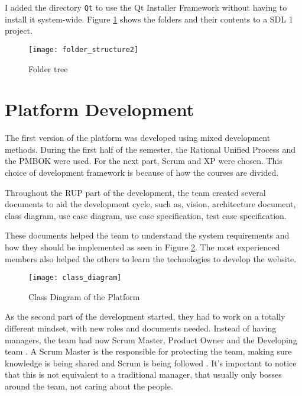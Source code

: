 I added the directory \texttt{Qt} to use the Qt Installer Framework without having to install it system-wide. Figure \ref{fig:folder_structure} shows the folders and their contents to a SDL 1 project.

\begin{figure}[h!]
\centering
\texttt{[image: folder\_structure2]}
\caption{Folder tree}
\label{fig:folder_structure}
\end{figure}

\section{Platform Development}
\label{sec:platform_development}

The first version of the platform was developed using mixed development methods. During the first half of the semester, the Rational Unified Process  and the PMBOK were used. For the next part, Scrum and XP were chosen. This choice of development framework is because of how the courses are divided.

Throughout the RUP part of the development, the team created several documents to aid the development cycle, such as, vision, architecture document, class diagram, use case diagram, use case specification, test case specification.

These documents helped the team to understand the system requirements and how they should be implemented as seen in Figure \ref{fig:class_diagram}. The most experienced members also helped the others to learn the technologies to develop the website.


\begin{figure}[h!]
\centering
\texttt{[image: class\_diagram]}
\caption{Class Diagram of the Platform \cite{plataforma2017arquitetura}}
\label{fig:class_diagram}
\end{figure}

As the second part of the development started, they had to work on a totally different mindset, with new roles and documents needed. Instead of having managers, the team had now Scrum Master, Product Owner and the Developing team \cite{agile422017}. A Scrum Master is the responsible for protecting the team, making sure knowledge is being shared and Scrum is being followed \cite{scrumalliance2017}. It's important to notice that this is not equivalent to a traditional manager, that usually only bosses around the team, not caring about the people.

